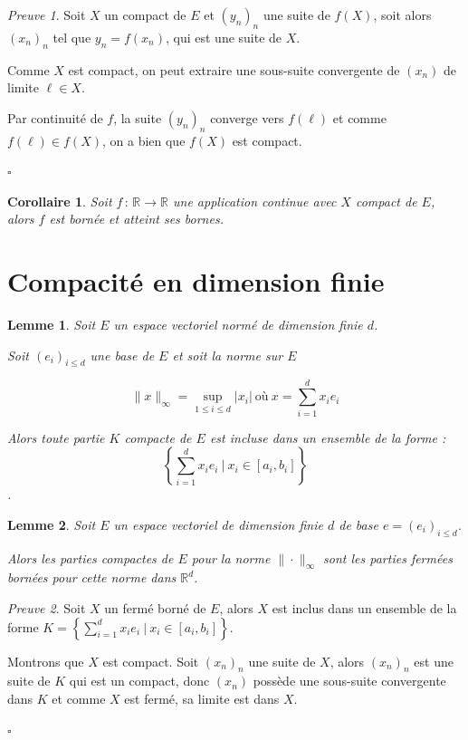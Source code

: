 \documentclass[]{article}
\newtheorem{mylemma}{Lemme}
\newtheorem{mycor}{Corollaire}
\theoremstyle{remark}
\newtheorem{myproof}{Preuve}
\theoremstyle{definition}
\newcommand{\cqfd}{
	\hfill$\square$
}
\newcommand{\funcshort}[3]{
#1 \, : \, #2 \longrightarrow #3
}
\begin{document}
\begin{myproof}
	Soit $X$ un compact de $E$ et $(y_n)_n$ une suite de $f(X)$, soit alors $(x_n)_n$ tel que $y_n=f(x_n)$, qui est une suite de $X$.
	
	Comme $X$ est compact, on peut extraire une sous-suite convergente de $(x_n)$ de limite $\ell \in X$.
	
	Par continuité de $f$, la suite $(y_n)_n$ converge vers $f(\ell)$ et comme $f(\ell) \in f(X)$, on a bien que $f(X)$ est compact.
	
	
	\cqfd
\end{myproof}

\begin{mycor}
	Soit $\funcshort{f}{\mathbb{R}}{\mathbb{R}}$ une application continue avec $X$ compact de $E$, alors $f$ est bornée et atteint ses bornes.
\end{mycor}

\section{Compacité en dimension finie}

\begin{mylemma}
	Soit $E$ un espace vectoriel normé de dimension finie $d$.
	
	Soit $(e_i)_{i \leqslant d}$ une base de $E$ et soit la norme sur $E$
	
	$$\|x\|_{\infty} = \sup\limits_{1 \leqslant i \leqslant d} |x_i| ~ \text{où} ~ x = \sum_{i=1}^{d} x_i e_i$$
	
	Alors toute partie $K$ compacte de $E$ est incluse dans un ensemble de la forme : $$\left\{ \sum_{i =1}^{d} x_i e_i ~ | ~ x_i \in [a_i, b_i] \right\}$$.
\end{mylemma}

\begin{mylemma}
	Soit $E$ un espace vectoriel de dimension finie $d$ de base $e=(e_i)_{i \leqslant d}$.
	
	Alors les parties compactes de $E$ pour la norme $\|\cdot\|_{\infty}$ sont les parties fermées bornées pour cette norme dans $\mathbb{R}^d$.
\end{mylemma}

\begin{myproof}
	Soit $X$ un fermé borné de $E$, alors $X$ est inclus dans un ensemble de la forme $K = \left\{ \sum_{i =1}^{d} x_i e_i ~ | ~ x_i \in [a_i, b_i] \right\}$.
	
	Montrons que $X$ est compact.
	 Soit $(x_n)_n$ une suite de $X$, alors $(x_n)_n$ est une suite de $K$ qui est un compact, donc $(x_n)$ possède une sous-suite convergente dans $K$ et comme $X$ est fermé, sa limite est dans $X$.
	 
	 \cqfd
\end{myproof}
\end{document}
